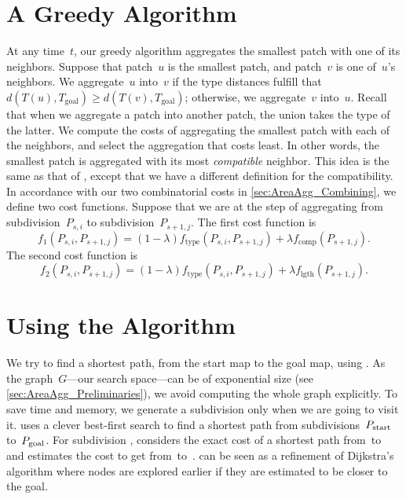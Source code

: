 \section{A Greedy Algorithm}
\label{sec:AreaAgg_Greedy}
At any time~$t$,
our greedy algorithm aggregates the smallest patch
with one of its neighbors.
Suppose that patch~$u$ is the smallest patch,
and patch~$v$ is one of~$u$'s neighbors.
We aggregate~$u$ into~$v$ 
if the type distances fulfill that
$d\left(T(u), T_\mathrm{goal}\right) 
\ge d\left(T(v), T_\mathrm{goal}\right)$;
otherwise, we aggregate~$v$ into~$u$.
Recall that when we aggregate a patch into another patch,
the union takes the type of the latter.
We compute the costs of aggregating the smallest patch 
with each of the neighbors, 
and select the aggregation that costs least.
In other words, the smallest patch is aggregated with 
its most \emph{compatible} neighbor.
This idea is the same as that of \textcite{vanOosterom2005},
except that we have a different definition 
for the compatibility.
In accordance with our two combinatorial costs in 
\sect\ref{sec:AreaAgg_Combining},
we define two cost functions.
Suppose that we are at the step of aggregating 
from subdivision~$P_{s,i}$ to subdivision~$P_{s+1,j}$.
The first cost function is 
\begin{equation}
\label{eq:f_1}
f_1(P_{s,i},P_{s+1,j})=
(1-\lambda)f_\mathrm{type}(P_{s,i},P_{s+1,j})
+\lambda f_{\mathrm{comp}}(P_{s+1,j}). \nonumber
\end{equation}
The second cost function is
\begin{equation}
\label{eq:f_2}
f_2(P_{s,i},P_{s+1,j})=
(1-\lambda)f_\mathrm{type}(P_{s,i},P_{s+1,j})
+\lambda f_{\mathrm{lgth}}(P_{s+1,j}). \nonumber
\end{equation}



\section{Using the \Astar Algorithm}
\label{sec:AreaAgg_AStar}

We try to find a shortest path,
from the start map to the goal map,
using \Astar \parencite{Hart1968,PatelAStar}.  
As the graph~$G$---our search space---can 
be of exponential size 
(see \sect\ref{sec:AreaAgg_Preliminaries}), 
we avoid computing the whole graph explicitly.
To save time and memory, 
we generate a subdivision \Pnode only 
when we are going to visit it.
\Astar uses a clever best-first search 
to find a shortest path 
from subdivisions~$P_\mathrm{start}$ to~$P_\mathrm{goal}$.  
For subdivision \Pnode,
\Astar considers the exact cost of a shortest path 
from~\Pstart to~\Pnode 
and estimates the cost to get from~\Pnode to~\Pgoal.  
\Astar can be seen as a refinement of Dijkstra's algorithm
where nodes are explored earlier 
if they are estimated to be closer to the goal.


